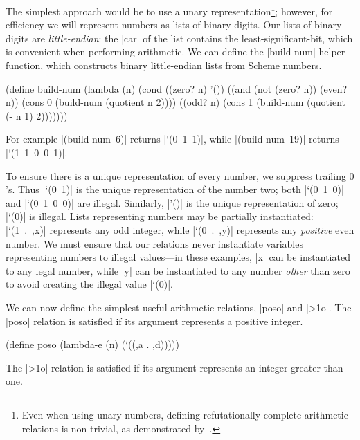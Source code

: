 The simplest approach would be to use a unary
representation\footnote{Even when using unary numbers, defining
  refutationally complete arithmetic relations is non-trivial, as
  demonstrated by~\citet{conf/flops/KiselyovBFS08}.}; however, for
efficiency we will represent numbers as lists of binary digits.  Our
lists of binary digits are \emph{little-endian}: the \scheme|car| of
the list contains the least-significant-bit, which is convenient when
performing arithmetic.  We can define the \scheme|build-num| helper
function, which constructs binary little-endian lists from Scheme
numbers.

\schemedisplayspace
\begin{schemedisplay}
(define build-num
  (lambda (n)
    (cond
      ((zero? n) '())
      ((and (not (zero? n)) (even? n))
       (cons 0 (build-num (quotient n 2))))
      ((odd? n)
       (cons 1 (build-num (quotient (- n 1) 2)))))))
\end{schemedisplay}

\noindent For example \mbox{\scheme|(build-num 6)|} returns
\mbox{\scheme|`(0 1 1)|}, while \mbox{\scheme|(build-num 19)|} returns
\mbox{\scheme|`(1 1 0 0 1)|}.

To ensure there is a unique representation of every number, we suppress
trailing $0$'s. Thus \mbox{\scheme|`(0 1)|} is the unique
representation of the number two; both \mbox{\scheme|`(0 1 0)|} and
\mbox{\scheme|`(0 1 0 0)|} are illegal.  Similarly, \scheme|'()| is
the unique representation of zero; \mbox{\scheme|`(0)|} is illegal.
Lists representing numbers may be partially instantiated:
\mbox{\scheme|`(1 . ,x)|} represents any odd integer, while
\mbox{\scheme|`(0 . ,y)|} represents any \emph{positive} even number.
We must ensure that our relations never instantiate variables
representing numbers to illegal values---in these examples, \scheme|x|
can be instantiated to any legal number, while \scheme|y| can be
instantiated to any number \emph{other} than zero to avoid creating
the illegal value \mbox{\scheme|`(0)|}.

We can now define the simplest useful arithmetic relations,
\scheme|poso| and \scheme|>1o|.  The \scheme|poso| relation is
satisfied if its argument represents a positive
integer.

\schemedisplayspace
\begin{schemedisplay}
(define poso
  (lambda-e (n)
    (`((,a . ,d)))))
\end{schemedisplay}

\noindent The \scheme|>1o| relation is satisfied if its argument
represents an integer greater than one.

